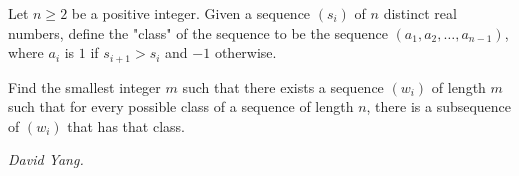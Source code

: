 Let $n\ge2$ be a positive integer. Given a sequence $\left(s_i\right)$ of $n$ distinct real numbers, define the "class" of the sequence to be the sequence $\left(a_1,a_2,\ldots,a_{n-1}\right)$, where $a_i$ is $1$ if $s_{i+1} > s_i$ and $-1$ otherwise.

Find the smallest integer $m$ such that there exists a sequence $\left(w_i\right)$ of length $m$ such that for every possible class of a sequence of length $n$, there is a subsequence of $\left(w_i\right)$ that has that class.

\textit{David Yang.}